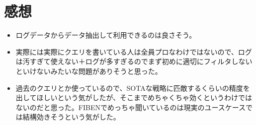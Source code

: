 \documentclass[dvipdfmx,uplatex]{jsarticle}
\theoremstyle{remark}
\newenvironment{kansou}{
    \begin{tcolorbox}[
        colframe=brown,
        colback=brown!10!white,
        colbacktitle=brown!40!white,
        coltitle=black,fonttitle=\bfseries
    ]
}{
    \end{tcolorbox}
}
\begin{document}
\section{感想}
\begin{kansou}
\begin{itemize}
  \item ログデータからデータ抽出して利用できるのは良さそう。
  \item 実際には実際にクエリを書いている人は全員プロなわけではないので、ログは汚すぎて使えない＋ログが多すぎるのでまず初めに適切にフィルタしないといけないみたいな問題がありそうと思った。
  \item 過去のクエリとか使っているので、SOTAな戦略に匹敵するくらいの精度を出してほしいという気がしたが、そこまでめちゃくちゃ効くというわけではないのだと思った。FIBENでめっちゃ聞いているのは現実のユースケースでは結構効きそうという気がした。
\end{itemize}
\end{kansou}



\end{document}
